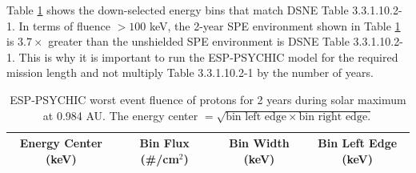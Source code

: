\documentclass{hitec}
\begin{document}
Table \ref{tab:ESP-PSYCHIC_2-year_subL1} shows the down-selected energy bins that match DSNE Table 3.3.1.10.2-1. In terms of fluence $> 100$ keV, the 2-year SPE environment shown in Table \ref{tab:ESP-PSYCHIC_2-year_subL1} is $3.7\times$ greater than the unshielded SPE environment is DSNE Table 3.3.1.10.2-1.%
This is why it is important to run the ESP-PSYCHIC model for the required mission length and not multiply Table 3.3.1.10.2-1 by the number of years.%

\begin{table}[!h]\centering
	\caption{ESP-PSYCHIC worst event fluence of protons for 2 years during solar maximum at 0.984 AU. The energy center $=\sqrt{\text{bin left edge}\times\text{bin right edge}.}$ }\label{tab:ESP-PSYCHIC_2-year_subL1}
	\begin{tabular}{|c | c | c | c |}\hline
		Energy Center (keV) & Bin Flux (\#/cm$^2$) & Bin Width (keV) & Bin Left Edge (keV) \\\hline


\end{tabular}
\end{table}
\end{document}
